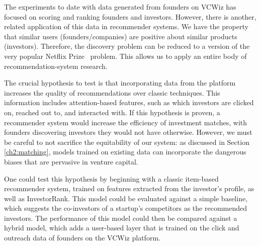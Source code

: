The experiments to date with data generated from founders on VCWiz has focused on scoring and ranking founders and investors. However, there is another, related application of this data in recommender systems. We have the property that similar users (founders/companies) are positive about similar products (investors). Therefore, the discovery problem can be reduced to a version of the very popular Netflix Prize~\cite{netflixpize} problem. This allows us to apply an entire body of recommendation-system research.

The crucial hypothesis to test is that incorporating data from the platform increases the quality of recommendations over classic techniques. This information includes attention-based features, such as which investors are clicked on, reached out to, and interacted with. If this hypothesis is proven, a recommender system would increase the efficiency of investment matches, with founders discovering investors they would not have otherwise. However, we must be careful to not sacrifice the equitability of our system: as discussed in Section \ref{ch2:matching}, models trained on existing data can incorporate the dangerous biases that are pervasive in venture capital.

One could test this hypothesis by beginning with a classic item-based recommender system, trained on features extracted from the investor's profile, as well as InvestorRank. This model could be evaluated against a simple baseline, which suggests the co-investors of a startup's competitors as the recommended investors. The performance of this model could then be compared against a hybrid model, which adds a user-based layer that is trained on the click and outreach data of founders on the VCWiz platform.
